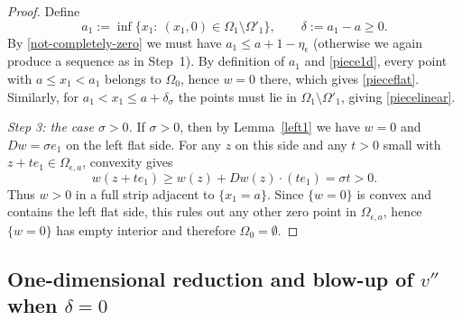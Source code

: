 \documentclass[reqno,11pt]{amsart}
\numberwithin{equation}{section}
\theoremstyle{remark}
\begin{document}
\begin{proof}
Define
\[
a_1:=\inf\{x_1:\ (x_1,0)\in \Omega_{1}\setminus \Omega'_{1}\},
\qquad \delta:=a_1-a\ge 0.
\]
By \eqref{not-completely-zero} we must have $a_1\le a+1-\eta_\epsilon$ (otherwise we again produce a sequence as in Step~1).
By definition of $a_1$ and \eqref{piece1d}, every point with $a\le x_1<a_1$ belongs to $\Omega_{0}$, hence $w=0$ there,
which gives \eqref{pieceflat}. Similarly, for $a_1<x_1\le a+\delta_\sigma$ the points must lie in
$\Omega_{1}\setminus\Omega'_{1}$, giving \eqref{piecelinear}.

\smallskip
\noindent\emph{Step 3: the case $\sigma>0$.}
If $\sigma>0$, then by Lemma~\ref{left1} we have $w=0$ and $Dw=\sigma e_1$ on the left flat side.
For any $z$ on this side and any $t>0$ small with $z+t e_1\in\Omega_{\epsilon,a}$, convexity gives
\[
w(z+t e_1)\ge w(z)+Dw(z)\cdot(t e_1)=\sigma t>0.
\]
Thus $w>0$ in a full strip adjacent to $\{x_1=a\}$.
Since $\{w=0\}$ is convex and contains the left flat side, this rules out any other zero point in $\Omega_{\epsilon,a}$,
hence $\{w=0\}$ has empty interior and therefore $\Omega_{0}=\emptyset$.
\end{proof}

\subsection{One-dimensional reduction and blow-up of $v''$ when $\delta=0$}
\end{document}
